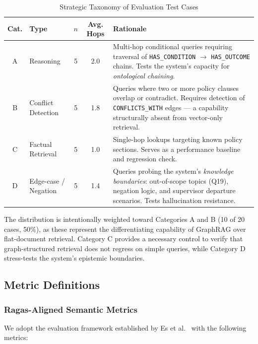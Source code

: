 \begin{table}[htbp]
\centering
\caption{Strategic Taxonomy of Evaluation Test Cases}
\label{tab:taxonomy}
\begin{tabular}{clccp{5.5cm}}
\toprule
\textbf{Cat.} & \textbf{Type} & \textbf{$n$} & \textbf{Avg. Hops} & \textbf{Rationale} \\
\midrule
A & Reasoning        & 5 & 2.0 & Multi-hop conditional queries requiring traversal of \texttt{HAS\_CONDITION} $\rightarrow$ \texttt{HAS\_OUTCOME} chains. Tests the system's capacity for \textit{ontological chaining}. \\
B & Conflict Detection & 5 & 1.8 & Queries where two or more policy clauses overlap or contradict. Requires detection of \texttt{CONFLICTS\_WITH} edges — a capability structurally absent from vector-only retrieval. \\
C & Factual Retrieval  & 5 & 1.0 & Single-hop lookups targeting known policy sections. Serves as a performance baseline and regression check. \\
D & Edge-case / Negation & 5 & 1.4 & Queries probing the system's \textit{knowledge boundaries}: out-of-scope topics (Q19), negation logic, and supervisor departure scenarios. Tests hallucination resistance. \\
\bottomrule
\end{tabular}
\end{table}

The distribution is intentionally weighted toward Categories A and B (10 of 20 cases, 50\%), as these represent the differentiating capability of GraphRAG over flat-document retrieval. Category C provides a necessary control to verify that graph-structured retrieval does not regress on simple queries, while Category D stress-tests the system's epistemic boundaries.

\subsection{Metric Definitions}
\label{sec:metrics}

\subsubsection{Ragas-Aligned Semantic Metrics}

We adopt the evaluation framework established by Es et al.~\cite{ragas2023} with the following metrics:


